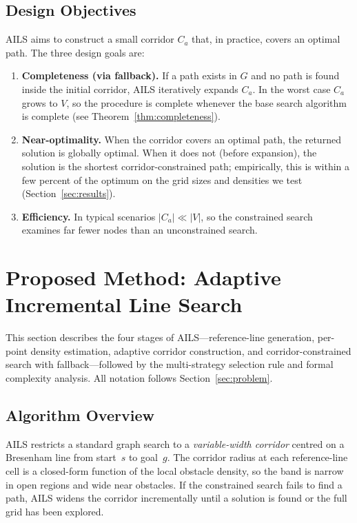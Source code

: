 \documentclass[journal]{IEEEtran}
\begin{document}
\subsection{Design Objectives}

AILS aims to construct a small corridor $C_a$ that, in practice, covers an optimal path.
The three design goals are:
\begin{enumerate}
    \item \textbf{Completeness (via fallback).}
    If a path exists in $G$ and no path is found inside the initial corridor, AILS iteratively expands $C_a$.
    In the worst case $C_a$ grows to $V$, so the procedure is complete whenever the base search algorithm is complete (see Theorem~\ref{thm:completeness}).

    \item \textbf{Near-optimality.}
    When the corridor covers an optimal path, the returned solution is globally optimal.
    When it does not (before expansion), the solution is the shortest corridor-constrained path; empirically, this is within a few percent of the optimum on the grid sizes and densities we test (Section~\ref{sec:results}).

    \item \textbf{Efficiency.}
    In typical scenarios $|C_a| \ll |V|$, so the constrained search examines far fewer nodes than an unconstrained search.
\end{enumerate}

\section{Proposed Method: Adaptive Incremental Line Search}
\label{sec:method}

This section describes the four stages of AILS---reference-line generation, per-point density estimation, adaptive corridor construction, and corridor-constrained search with fallback---followed by the multi-strategy selection rule and formal complexity analysis.
All notation follows Section~\ref{sec:problem}.

\subsection{Algorithm Overview}

AILS restricts a standard graph search to a \emph{variable-width corridor} centred on a Bresenham line from start~$s$ to goal~$g$.
The corridor radius at each reference-line cell is a closed-form function of the local obstacle density, so the band is narrow in open regions and wide near obstacles.
If the constrained search fails to find a path, AILS widens the corridor incrementally until a solution is found or the full grid has been explored.
\end{document}
